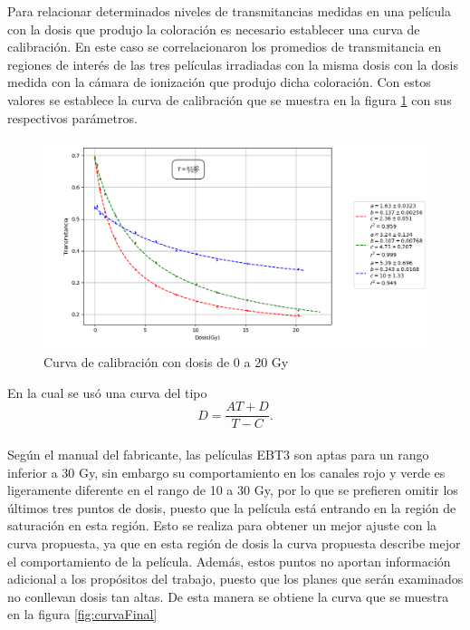 Para relacionar determinados niveles de transmitancias medidas en una película con la dosis que produjo la coloración es necesario establecer una curva de calibración. En este caso se correlacionaron los promedios de transmitancia en regiones de interés de las tres películas irradiadas con la misma dosis con la dosis medida con la cámara de ionización que produjo dicha coloración. Con estos valores se establece la curva de calibración que se muestra en la figura \ref{fig:curvaFinal20} con sus respectivos parámetros.\\


\begin{figure}[H]
	\centering
\includegraphics[width=\linewidth]{images/calibracionMulti0a20.png}
	
	\caption{Curva de calibración con dosis de 0 a 20 Gy }
	\label{fig:curvaFinal20}
\end{figure}

En la cual se usó una curva del tipo 
\begin{equation}
D=\frac{AT+D}{T-C}.
\end{equation}\\

Según el manual del fabricante, las películas EBT3 son aptas para un rango inferior a 30 Gy, sin embargo su comportamiento en los canales rojo y verde es ligeramente diferente en el rango de 10 a 30 Gy, por lo que se prefieren omitir los últimos tres puntos de dosis, puesto que la película está entrando en la región de saturación en esta región. Esto se realiza para obtener un mejor ajuste con la curva propuesta, ya que en esta región de dosis la curva propuesta describe mejor el comportamiento de la película.  Además, estos puntos no aportan información adicional a los propósitos del trabajo, puesto que los planes que serán examinados no conllevan dosis tan altas. De esta manera se obtiene la curva que se muestra en la figura \ref{fig:curvaFinal}\\

